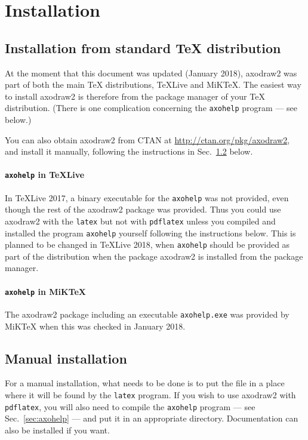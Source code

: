 \documentclass[12pt]{article}
\def\program#1{\texttt{#1}}
\begin{document}
\section{Installation}
\label{sec:installation}

\subsection{Installation from standard \TeX{} distribution}

At the moment that this document was updated (January 2018), axodraw2
was part of both the main \TeX{} distributions, TeXLive and MiKTeX.
The easiest way to install axodraw2 is therefore from the package
manager of your \TeX{} distribution.  (There is one complication
concerning the \program{axohelp} program --- see below.)

You can also obtain axodraw2 from CTAN at
\url{http://ctan.org/pkg/axodraw2}, and install it manually, following
the instructions in Sec.\ \ref{sec:manual.install} below.

\paragraph{\program{axohelp} in TeXLive}
In TeXLive 2017, a binary executable for the \program{axohelp} was not
provided, even though the rest of the axodraw2 package was provided.
Thus you could use axodraw2 with the \program{latex} but not with
\program{pdflatex} unless you compiled and installed the program
\program{axohelp} yourself following the instructions below.  This is
planned to be changed in TeXLive 2018, when \program{axohelp} should
be provided as part of the distribution when the package axodraw2 is
installed from the package manager.

\paragraph{\program{axohelp} in MiKTeX}
The axodraw2 package including an executable \program{axohelp.exe} was
provided by MiKTeX when this was checked in January 2018.



\subsection{Manual installation}
\label{sec:manual.install}

For a manual installation, what needs to be done is to put the file
 in a place where it will be found by the
\program{latex} program.  If you wish to use axodraw2 with
\program{pdflatex}, you will also need to compile the
\program{axohelp} program --- see Sec.\ \ref{sec:axohelp} --- and put
it in an appropriate directory.  Documentation can also be installed
if you want.
\end{document}
